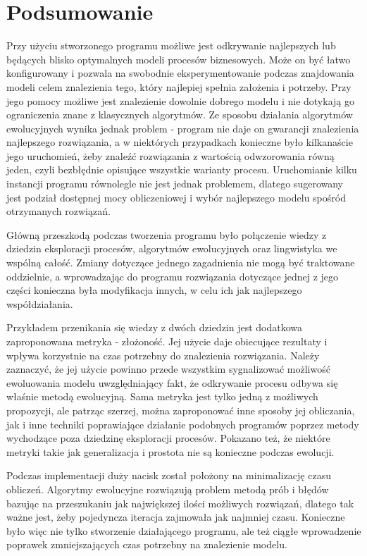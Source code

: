 \chapter{Podsumowanie}

Przy użyciu stworzonego programu możliwe jest odkrywanie najlepszych lub będących blisko optymalnych modeli procesów biznesowych. Może on być łatwo konfigurowany i pozwala na swobodnie eksperymentowanie podczas znajdowania modeli celem znalezienia tego, który najlepiej spełnia założenia i potrzeby. Przy jego pomocy możliwe jest znalezienie dowolnie dobrego modelu i nie dotykają go ograniczenia znane z klasycznych algorytmów. Ze sposobu działania algorytmów ewolucyjnych wynika jednak problem - program nie daje on gwarancji znalezienia najlepszego rozwiązania, a w niektórych przypadkach konieczne było kilkanaście jego uruchomień, żeby znaleźć rozwiązania z wartością odwzorowania równą jeden, czyli bezbłędnie opisujące wszystkie warianty procesu. Uruchomianie kilku instancji programu równolegle nie jest jednak problemem, dlatego sugerowany jest podział dostępnej mocy obliczeniowej i wybór najlepszego modelu spośród otrzymanych rozwiązań. 

Główną przeszkodą podczas tworzenia programu było połączenie wiedzy z dziedzin eksploracji procesów, algorytmów ewolucyjnych oraz lingwistyka we wspólną całość. Zmiany dotyczące jednego zagadnienia nie mogą być traktowane oddzielnie, a wprowadzając do programu rozwiązania dotyczące jednej z jego części konieczna była modyfikacja innych, w celu ich jak najlepszego współdziałania.

Przykładem przenikania się wiedzy z dwóch dziedzin jest dodatkowa zaproponowana metryka - złożoność. Jej użycie daje obiecujące rezultaty i wpływa korzystnie na czas potrzebny do znalezienia rozwiązania. Należy zaznaczyć, że jej użycie powinno przede wszystkim sygnalizować możliwość ewoluowania modelu uwzględniający fakt, że odkrywanie procesu odbywa się właśnie metodą ewolucyjną. Sama metryka jest tylko jedną z możliwych propozycji, ale patrząc szerzej, można zaproponować inne sposoby jej obliczania, jak i inne techniki poprawiające działanie podobnych programów poprzez metody wychodzące poza dziedzinę eksploracji procesów. Pokazano też, że niektóre metryki takie jak generalizacja i prostota nie są konieczne podczas ewolucji.

Podczas implementacji duży nacisk został położony na minimalizację czasu obliczeń. Algorytmy ewolucyjne rozwiązują problem metodą prób i błędów bazując na przeszukaniu jak największej ilości możliwych rozwiązań, dlatego tak ważne jest, żeby pojedyncza iteracja zajmowała jak najmniej czasu. Konieczne było więc nie tylko stworzenie działającego programu, ale też ciągłe wprowadzenie poprawek zmniejszających czas potrzebny na znalezienie modelu.

